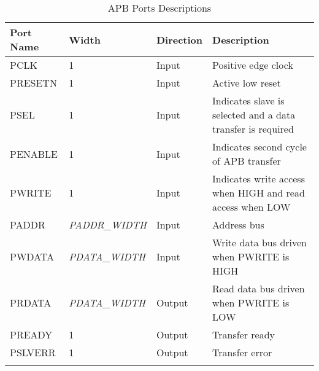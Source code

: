 \renewcommand*{\arraystretch}{1.4}
\begin{longtable}[H]{
  | p{}
  | p{}
  | p{}
  | p{} |
  }
  \hline
  \textbf{Port Name} &   
  \textbf{Width} &   
  \textbf{Direction} &   
  \textbf{Description} \\ \hline \hline

  PCLK &       
  1 &       
  Input &       
  Positive edge clock \\ \hline

  PRESETN &       
  1 &       
  Input &       
  Active low reset \\ \hline

  PSEL &       
  1 & 
  Input &       
  Indicates slave is selected and a data transfer is required \\ \hline

  PENABLE &        
  1 & 
  Input &       
  Indicates second cycle of APB transfer \\ \hline

  PWRITE &        
  1 & 
  Input &       
  Indicates write access when HIGH and read access when LOW\\ \hline

  PADDR &      
  \textit{PADDR\_WIDTH} & 
  Input &     
  Address bus \\ \hline

  PWDATA &      
  \textit{PDATA\_WIDTH} & 
  Input &     
  Write data bus driven when PWRITE is HIGH\\ \hline

  PRDATA &      
  \textit{PDATA\_WIDTH} & 
  Output &     
  Read data bus driven when PWRITE is LOW\\ \hline
 
  PREADY &        
  1 & 
  Output &       
  Transfer ready \\ \hline

  PSLVERR &        
  1 & 
  Output &       
  Transfer error \\ \hline

  \caption{APB Ports Descriptions}\label{table:interface}
\end{longtable}

